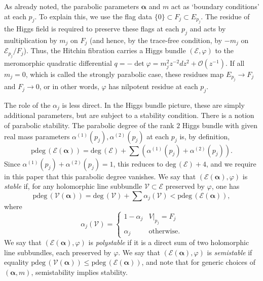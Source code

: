 \documentclass[12pt,letterpaper,reqno]{amsart}
\def\mathbf#1{#1}%
\theoremstyle{remark}
\theoremstyle{definition}
\numberwithin{thm}{section}
\numberwithin{equation}{section}
\numberwithin{figure}{section}
\newcommand{\cO}{\ensuremath{\mathcal O}}
\newcommand{\cV}{\ensuremath{\mathcal V}}
\newcommand{\cE}{{\mathcal E}}
\begin{document}
As already noted, the parabolic parameters $\boldsymbol{\alpha}$ and $\mathbf{m}$ act as `boundary conditions' at each $p_j$.  To explain this, we use
the flag data $\{0\} \subset F_j \subset E_{p_j}$. The residue of the Higgs field is required to preserve these flags at each $p_j$ and
acts by multiplication by $m_j$ on $F_j$ (and hence, by the trace-free condition, by $-m_j$ on $\cE_{p_j}/F_j$).  Thus, the Hitchin fibration carries a 
Higgs bundle $(\cE, \varphi)$ to the meromorphic quadratic differential $q = - \det \varphi = m_j^2 z^{-2}dz^2 + \cO(z^{-1})$. If all $m_j = 0$, which
is called the strongly parabolic case, these residues map $E_{p_j}  \to F_j$ and $F_j \to 0$, or in other  words,  $\varphi$ has nilpotent residue at each $p_j$. 

The role of the $\alpha_j$ is less direct. In the Higgs bundle picture, these are simply additional parameters, but are subject to a stability condition. There is a notion of parabolic stability. The parabolic degree of the rank $2$ Higgs bundle with given real mass parameters
$\alpha^{(1)}(p_j), \alpha^{(2)}(p_j)$ at each $p_j$ is, by definition, 
\[
\mathrm{pdeg}\, (\cE(\boldsymbol{\alpha})) = \mathrm{deg}\,(\cE) + \sum (\alpha^{(1)}(p_j) + \alpha^{(2)}(p_j)).
\]
Since $\alpha^{(1)}(p_j) + \alpha^{(2)}(p_j) = 1$, this reduces to $\mathrm{deg}\,(\cE) + 4$, and we require in this paper that this parabolic degree vanishes.
We say that $(\cE(\boldsymbol{\alpha}), \varphi)$ is \emph{stable} if, for any holomorphic line subbundle $\cV \subset \cE$ preserved by $\varphi$, one has 
\[
\mathrm{pdeg}\, (\cV(\boldsymbol{\alpha})) =\mathrm{deg}\, (\cV) + \sum \alpha_j(\mathcal{V}) < \mathrm{pdeg}\, (\cE(\boldsymbol{\alpha})),
\]
where 
\[\alpha_j(\mathcal{V}) =\begin{cases} 1- \alpha_j & V|_{p_j} = F_j \\ \alpha_j & \mbox{otherwise}. \end{cases}\]
We say that $(\cE(\boldsymbol{\alpha}), \varphi)$ is \emph{polystable} if it is a direct sum of two holomorphic line subbundles, each preserved by $\varphi$.  
We say that $(\cE(\boldsymbol{\alpha}), \varphi)$ is \emph{semistable} if equality $\mathrm{pdeg}\, (\cV(\boldsymbol{\alpha})) \leq \mathrm{pdeg}\, (\cE(\boldsymbol{\alpha}))$, and note that for generic choices of $(\boldsymbol{\alpha}, \mathbf{m})$, semistability implies stability. 
\end{document}
